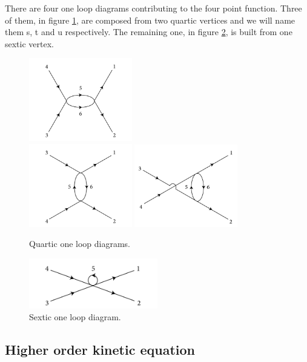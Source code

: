 There are four  one loop diagrams contributing to the four point function. Three of them, in figure \ref{fig:quarticoneloop}, are composed from two quartic vertices and
we will name them s, t and u respectively.
The remaining one, in figure \ref{fig:sexticoneloop}, is built from one sextic vertex.
\begin{figure}[ht]
    \centering
    \includegraphics[width=0.4\textwidth]{images/schanneloneloop.jpg}\\
    \includegraphics[width=0.4\textwidth]{images/tchanneloneloop.jpg}
    \includegraphics[width=0.4\textwidth]{images/uchanneloneloop.jpg}
    \caption{Quartic one loop diagrams.}
    \label{fig:quarticoneloop}
\end{figure} 
\begin{figure}[ht]
    \centering
    \includegraphics[width=0.5\textwidth]{images/sexticdiagram.jpg}
    \caption{Sextic one loop diagram.}
    \label{fig:sexticoneloop}
\end{figure}
\subsection{Higher order kinetic equation}




